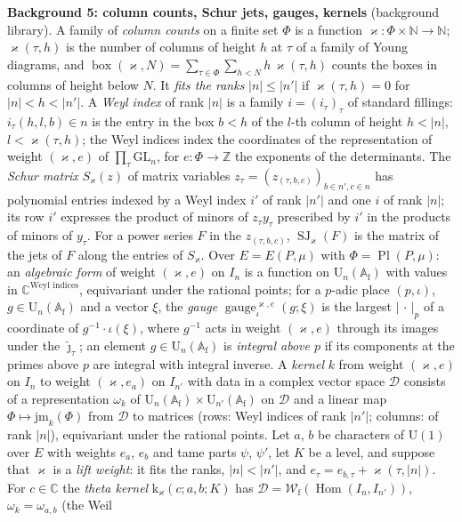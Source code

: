 \documentclass[11pt,a4paper]{article}
\newcommand{\Z}{\mathbb{Z}}
\newcommand{\subhead}[1]{\par\addvspace{9pt plus 2pt}\Needspace{4\baselineskip}\noindent\textbf{#1}\enspace\ignorespaces}
\theoremstyle{plainx}
\theoremstyle{uprightx}
\newcommand{\CC}{\mathbb{C}}
\newcommand{\NN}{\mathbb{N}}
\newcommand{\np}[1]{|#1|_p}
\newcommand{\Af}{\mathbb{A}_{\mathrm{f}}}
\newcommand{\EP}[2]{E(#1,#2)}
\newcommand{\PlP}[2]{\operatorname{Pl}(#1,#2)}
\newcommand{\Wf}[1]{\mathcal{W}_{\mathrm{f}}(#1)}
\newcommand{\Uf}[1]{\mathrm{U}_{#1}(\Af)}
\newcommand{\stdsp}[1]{I_{#1}}
\newcommand{\homsp}[2]{\operatorname{Hom}(\stdsp{#1},\stdsp{#2})}
\newcommand{\gauge}[4]{\operatorname{gauge}^{#1,#2}_{\iota}(#3;#4)}   %
\newcommand{\boxes}[2]{\operatorname{box}(#1,#2)}
\newcommand{\schurjet}[2]{\operatorname{SJ}_{#1}(#2)}
\newcommand{\thker}[5]{\mathrm{k}_{#1}(#2;#3,#4;#5)}
\newcommand{\pairw}[2]{\omega_{#1,#2}}
\begin{document}
\subhead{Background 5: column counts, Schur jets, gauges, kernels} (background library). A family of \emph{column
counts} on a finite set $\Phi$ is a function $\varkappa\colon\Phi\times\NN\to\NN$; $\varkappa(\tau,h)$ is the number
of columns of height $h$ at $\tau$ of a family of Young diagrams, and
$\boxes{\varkappa}{N}=\sum_{\tau\in\Phi}\sum_{h<N}h\,\varkappa(\tau,h)$ counts the boxes in columns of height below
$N$. It \emph{fits the ranks} $|n|\le|n'|$ if $\varkappa(\tau,h)=0$ for $|n|<h<|n'|$. A \emph{Weyl index} of rank
$|n|$ is a family $i=(i_\tau)_\tau$ of standard fillings: $i_\tau(h,l,b)\in n$ is the entry in the box $b<h$ of the
$l$-th column of height $h<|n|$, $l<\varkappa(\tau,h)$; the Weyl indices index the coordinates of the
representation of weight $(\varkappa,e)$ of $\prod_\tau\mathrm{GL}_n$, for $e\colon\Phi\to\Z$ the exponents of the
determinants. The \emph{Schur matrix} $S_\varkappa(z)$ of matrix variables $z_\tau=(z_{(\tau,b,c)})_{b\in n',c\in n}$
has polynomial entries indexed by a Weyl index $i'$ of rank $|n'|$ and one $i$ of rank $|n|$; its row $i'$ expresses
the product of minors of $z_\tau y_\tau$ prescribed by $i'$ in the products of minors of $y_\tau$. For a power
series $F$ in the $z_{(\tau,b,c)}$, $\schurjet{\varkappa}{F}$ is the matrix of the jets of $F$ along the entries of
$S_\varkappa$. Over $E=\EP{P}{\mu}$ with $\Phi=\PlP{P}{\mu}$: an \emph{algebraic form} of weight $(\varkappa,e)$ on
$\stdsp{n}$ is a function on $\Uf{n}$ with values in $\CC^{\text{Weyl indices}}$, equivariant under the rational
points; for a $p$-adic place $(p,\iota)$, $g\in\Uf{n}$ and a vector $\xi$, the \emph{gauge} $\gauge{\varkappa}{e}{g}{\xi}$ is
the largest $\np{\,\cdot\,}$ of a coordinate of $g^{-1}\cdot \iota(\xi)$, where $g^{-1}$ acts in weight $(\varkappa,e)$
through its images under the $\hat\jmath_\tau$; an element $g\in\Uf{n}$ is \emph{integral above $p$} if its
components at the primes above $p$ are integral with integral inverse. A \emph{kernel} $k$ from weight
$(\varkappa,e)$ on $\stdsp{n}$ to weight $(\varkappa,e_a)$ on $\stdsp{n'}$ with data in a complex vector space
$\mathcal{D}$ consists of a representation $\omega_k$ of $\Uf{n}\times\Uf{n'}$ on $\mathcal{D}$ and a linear map
$\Phi\mapsto\mathrm{jm}_k(\Phi)$ from $\mathcal{D}$ to matrices (rows: Weyl indices of rank $|n'|$; columns: of rank
$|n|$), equivariant under the rational points. Let $a$, $b$ be characters of $\mathrm{U}(1)$ over $E$ with weights
$e_a$, $e_b$ and tame parts $\psi$, $\psi'$, let $K$ be a level, and suppose that $\varkappa$ is a \emph{lift
weight}: it fits the ranks, $|n|<|n'|$, and $e_\tau=e_{b,\tau}+\varkappa(\tau,|n|)$. For $c\in\CC$ the \emph{theta
kernel} $\thker{\varkappa}{c}{a}{b}{K}$ has $\mathcal{D}=\Wf{\homsp{n}{n'}}$, $\omega_k=\pairw{a}{b}$ (the Weil
\end{document}

